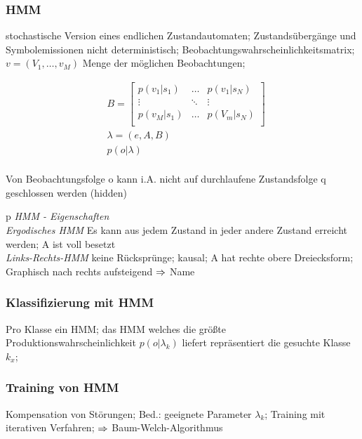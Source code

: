 \documentclass[german,color,6pt]{latex4ei/latex4ei_sheet}
\begin{document}
\begin{sectionbox}
\subsubsection{HMM}
stochastische Version eines endlichen Zustandautomaten; Zustandsübergänge und Symbolemissionen nicht deterministisch; Beobachtungswahrscheinlichkeitsmatrix; $v = (V_1, \dots, v_M)$ Menge der möglichen Beobachtungen;

\begin{equation*}
\begin{split}
&	B = \begin{bmatrix}
	p(v_1 | s_1) & \dots & p(v_1 | s_N) \\
	\vdots & \ddots & \vdots \\
	p(v_M | s_1) & \dots & p(V_m | s_N) \\
\end{bmatrix} \\
& \lambda = (e, A, B) \\
& p(o | \lambda ) \\
\end{split}
\end{equation*}

Von Beobachtungsfolge o kann i.A. nicht auf durchlaufene Zustandsfolge q geschlossen werden (hidden)

\begin{tablebox}{p{\textwidth}}
\emph{HMM - Eigenschaften} \\ %
\cmrule
\emph{Ergodisches HMM} \quad Es kann aus jedem Zustand in jeder andere Zustand erreicht werden; A ist voll besetzt \\
\emph{Links-Rechts-HMM} \quad keine Rücksprünge; kausal; A hat rechte obere Dreiecksform; Graphisch nach rechts aufsteigend $\Rightarrow$ Name
\end{tablebox}
\end{sectionbox}

\begin{sectionbox}
\subsubsection{Klassifizierung mit HMM}
Pro Klasse ein HMM; das HMM welches die größte Produktionswahrscheinlichkeit $p(o|\lambda_k)$ liefert repräsentiert die gesuchte Klasse $k_x$;
\end{sectionbox}

\begin{sectionbox}
\subsubsection{Training von HMM}
Kompensation von Störungen; Bed.: geeignete Parameter $\lambda_k$; Training mit iterativen Verfahren; $\Rightarrow$ Baum-Welch-Algorithmus
\end{sectionbox}
\end{document}
